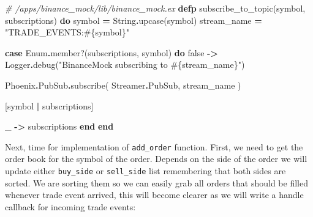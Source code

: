 \documentclass[
]{book}
\newenvironment{Shaded}{\begin{snugshade}}{\end{snugshade}}
\newcommand{\CommentTok}[1]{\textcolor[rgb]{0.56,0.35,0.01}{\textit{#1}}}
\newcommand{\ConstantTok}[1]{\textcolor[rgb]{0.00,0.00,0.00}{#1}}
\newcommand{\KeywordTok}[1]{\textcolor[rgb]{0.13,0.29,0.53}{\textbf{#1}}}
\newcommand{\NormalTok}[1]{#1}
\newcommand{\OperatorTok}[1]{\textcolor[rgb]{0.81,0.36,0.00}{\textbf{#1}}}
\newcommand{\OtherTok}[1]{\textcolor[rgb]{0.56,0.35,0.01}{#1}}
\newcommand{\StringTok}[1]{\textcolor[rgb]{0.31,0.60,0.02}{#1}}
\begin{document}
\begin{Shaded}
\begin{Highlighting}[]
\CommentTok{\# /apps/binance\_mock/lib/binance\_mock.ex}
  \KeywordTok{defp}\NormalTok{ subscribe\_to\_topic(symbol, subscriptions) }\KeywordTok{do}
\NormalTok{    symbol }\OperatorTok{=} \ConstantTok{String}\OperatorTok{.}\NormalTok{upcase(symbol)}
\NormalTok{    stream\_name }\OperatorTok{=} \StringTok{"TRADE\_EVENTS:}\OtherTok{\#\{}\NormalTok{symbol}\OtherTok{\}}\StringTok{"}

    \KeywordTok{case} \ConstantTok{Enum}\OperatorTok{.}\NormalTok{member?(subscriptions, symbol) }\KeywordTok{do}
      \ConstantTok{false} \OperatorTok{{-}\textgreater{}}
        \ConstantTok{Logger}\OperatorTok{.}\NormalTok{debug(}\StringTok{"BinanceMock subscribing to }\OtherTok{\#\{}\NormalTok{stream\_name}\OtherTok{\}}\StringTok{"}\NormalTok{)}

        \ConstantTok{Phoenix}\OperatorTok{.}\ConstantTok{PubSub}\OperatorTok{.}\NormalTok{subscribe(}
          \ConstantTok{Streamer}\OperatorTok{.}\ConstantTok{PubSub}\NormalTok{,}
\NormalTok{          stream\_name}
\NormalTok{        )}

\NormalTok{        [symbol }\OperatorTok{|}\NormalTok{ subscriptions]}

\NormalTok{      \_ }\OperatorTok{{-}\textgreater{}}
\NormalTok{        subscriptions}
    \KeywordTok{end}
  \KeywordTok{end}
\end{Highlighting}
\end{Shaded}

Next, time for implementation of \texttt{add\_order} function. First, we need to get the order book for the symbol of the order. Depends on the side of the order we will update either \texttt{buy\_side} or \texttt{sell\_side} list remembering that both sides are sorted. We are sorting them so we can easily grab all orders that should be filled whenever trade event arrived, this will become clearer as we will write a handle callback for incoming trade events:
\end{document}
